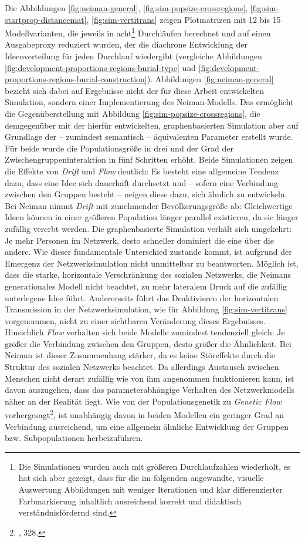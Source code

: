 \documentclass[openany,twoside,twocolumn]{book}
\let\rmarkdownfootnote\footnote%
\def\footnote{\protect\rmarkdownfootnote}
\begin{document}
Die Abbildungen \ref{fig:neiman-general}, \ref{fig:sim-popsize-crossregions}, \ref{fig:sim-startprop-distancemat}, \ref{fig:sim-vertitrans} zeigen Plotmatrizen mit 12 bis 15 Modellvarianten, die jeweils in acht\footnote{Die Simulationen wurden auch mit größeren Durchlaufzahlen wiederholt, es hat sich aber gezeigt, dass für die im folgenden angewandte, visuelle Auswertung Abbildungen mit weniger Iterationen und klar differenzierter Farbmarkierung inhaltlich ausreichend korrekt und didaktisch verständnisfördernd sind.} Durchläufen berechnet und auf einen Ausgabeproxy reduziert wurden, der die diachrone Entwicklung der Ideenverteilung für jeden Durchlauf wiedergibt (vergleiche Abbildungen \ref{fig:development-proportions-regions-burial-type} und \ref{fig:development-proportions-regions-burial-construction}). Abbildungen \ref{fig:neiman-general} bezieht sich dabei auf Ergebnisse nicht der für diese Arbeit entwickelten Simulation, sondern einer Implementierung des Neiman-Modells. Das ermöglicht die Gegenüberstellung mit Abbildung \ref{fig:sim-popsize-crossregions}, die demgegenüber mit der hierfür entwickelten, graphenbasierten Simulation aber auf Grundlage der -- zumindest semantisch -- äquivalenten Parameter erstellt wurde. Für beide wurde die Populationsgröße in drei und der Grad der Zwischengruppeninteraktion in fünf Schritten erhöht. Beide Simulationen zeigen die Effekte von \emph{Drift} und \emph{Flow} deutlich: Es besteht eine allgemeine Tendenz dazu, dass eine Idee sich dauerhaft durchsetzt und -- sofern eine Verbindung zwischen den Gruppen besteht -- neigen diese dazu, sich ähnlich zu entwickeln. Bei Neiman nimmt \emph{Drift} mit zunehmender Bevölkerungsgröße ab: Gleichwertige Ideen können in einer größeren Population länger parallel existieren, da sie länger zufällig vererbt werden. Die graphenbasierte Simulation verhält sich umgekehrt: Je mehr Personen im Netzwerk, desto schneller dominiert die eine über die andere. Wie dieser fundamentale Unterschied zustande kommt, ist aufgrund der Emergenz der Netzwerksimulation nicht unmittelbar zu beantworten. Möglich ist, dass die starke, horizontale Verschränkung des sozialen Netzwerks, die Neimans generationales Modell nicht beachtet, zu mehr lateralem Druck auf die zufällig unterlegene Idee führt. Andererseits führt das Deaktivieren der horizontalen Transmission in der Netzwerksimulation, wie für Abbildung \ref{fig:sim-vertitrans} vorgenommen, nicht zu einer sichtbaren Veränderung dieses Ergebnisses. Hinsichlich \emph{Flow} verhalten sich beide Modelle zumindest tendenziell gleich: Je größer die Verbindung zwischen den Gruppen, desto größer die Ähnlichkeit. Bei Neiman ist dieser Zusammenhang stärker, da es keine Störeffekte durch die Struktur des sozialen Netzwerks beachtet. Da allerdings Austausch zwischen Menschen nicht derart zufällig wie von ihm angenommen funktionieren kann, ist davon auszugehen, dass das parameterabhängige Verhalten des Netzwerkmodells näher an der Realität liegt. Wie von der Populationsgenetik zu \emph{Genetic Flow} vorhergesagt\footnote{\textcite{frankham_introduction_2002}, 328.}, ist unabhängig davon in beiden Modellen ein geringer Grad an Verbindung ausreichend, um eine allgemein ähnliche Entwicklung der Gruppen bzw. Subpopulationen herbeizuführen.
\end{document}
